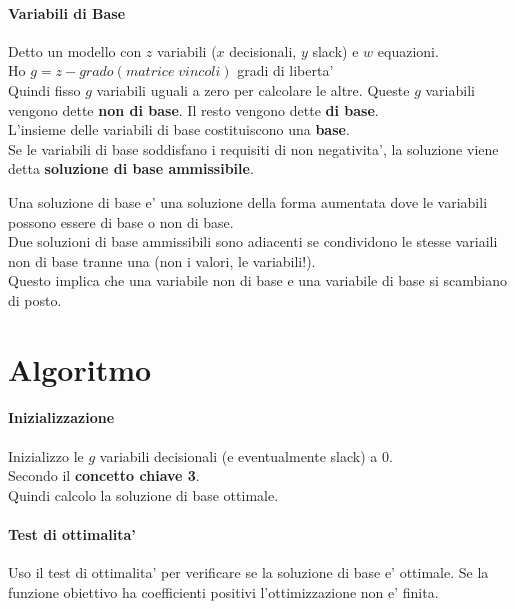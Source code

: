 \paragraph{Variabili di Base}

Detto un modello con $z$ variabili ($x$ decisionali, $y$ slack) e $w$ equazioni. \\
Ho $g = z - grado(matrice \; vincoli)$ gradi di liberta' \\
Quindi fisso $g$ variabili uguali a zero per calcolare le altre. Queste $g$ variabili vengono dette \textbf{non di base}. Il resto vengono dette \textbf{di base}. \\
L'insieme delle variabili di base costituiscono una \textbf{base}. \\
Se le variabili di base soddisfano i requisiti di non negativita', la soluzione viene detta \textbf{soluzione di base ammissibile}.

Una soluzione di base e' una soluzione della forma aumentata dove le variabili possono essere di base o non di base. \\

Due soluzioni di base ammissibili sono adiacenti se condividono le stesse variaili non di base tranne una (non i valori, le variabili!). \\
Questo implica che una variabile non di base e una variabile di base si scambiano di posto.

\section{Algoritmo}

\paragraph{Inizializzazione}

Inizializzo le $g$ variabili decisionali (e eventualmente slack) a 0. \\
Secondo il \textbf{concetto chiave 3}. \\
Quindi calcolo la soluzione di base ottimale.

\paragraph{Test di ottimalita'}

Uso il test di ottimalita' per verificare se la soluzione di base e' ottimale.
Se la funzione obiettivo ha coefficienti positivi l'ottimizzazione non e' finita.

